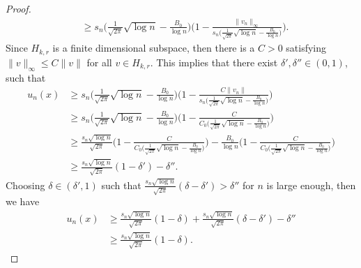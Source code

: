 \documentclass[10pt,a4paper]{amsart}
\begin{document}
\begin{proof}
\begin{align*}
			& \geq s_n \Big( \frac{1}{\sqrt{2\pi}}\sqrt{\log{n}} - \frac{B_0}{\log{n}}\Big) \Bigg( 1- \frac{ \|v_n\|_\infty}{s_n\Big(\frac{1}{\sqrt{2\pi}}\sqrt{\log{n}}- \frac{B_0}{\log{n}}\Big)} \Bigg).
		\end{align*}
		Since $H_{k,r}$ is a finite dimensional subspace, then there is a $C>0$ satisfying $\|v\|_\infty \leq C \|v\|$ for all $v\in H_{k,r}$. This implies that there exist $\delta', \delta'' \in (0,1)$, such that 
		\begin{align*}
			u_n(x)& \geq s_n \Big( \frac{1}{\sqrt{2\pi}}\sqrt{\log{n}} - \frac{B_0}{\log{n}}\Big)\Bigg( 1- \frac{ C\|v_n\|}{s_n\Big(\frac{1}{\sqrt{2\pi}}\sqrt{\log{n}}- \frac{B_0}{\log{n}}\Big)} \Bigg)\\
			& \geq s_n \Big( \frac{1}{\sqrt{2\pi}}\sqrt{\log{n}} - \frac{B_0}{\log{n}}\Big) \Bigg( 1- \frac{ C}{C_0\Big(\frac{1}{\sqrt{2\pi}}\sqrt{\log{n}}- \frac{B_0}{\log{n}}\Big)} \Bigg)\\
			& \geq \frac{s_n \sqrt{\log{n}}}{\sqrt{2\pi}} \Bigg( 1- \frac{ C}{C_0\Big(\frac{1}{\sqrt{2\pi}}\sqrt{\log{n}}- \frac{B_0}{\log{n}}\Big)} \Bigg)- \frac{B_0}{\log{n}} \Bigg( 1- \frac{ C}{C_0\Big(\frac{1}{\sqrt{2\pi}}\sqrt{\log{n}}- \frac{B_0}{\log{n}}\Big)} \Bigg)\\
			& \geq \frac{s_n \sqrt{\log{n}}}{\sqrt{2\pi}} (1-\delta') - \delta''.
		\end{align*}
		Choosing $ \delta \in (\delta', 1)$ such that $\frac{s_n \sqrt{\log{n}}}{\sqrt{2\pi}} (\delta-\delta') > \delta''$ for $n$ is large enough, then we have
		\begin{align*}
			u_n(x) &\geq \frac{s_n \sqrt{\log{n}}}{\sqrt{2\pi}} (1-\delta) + \frac{s_n \sqrt{\log{n}}}{\sqrt{2\pi}} (\delta-\delta') - \delta''\\
			& \geq \frac{s_n \sqrt{\log{n}}}{\sqrt{2\pi}} (1-\delta).
		\end{align*}
		

\end{proof}
\end{document}
